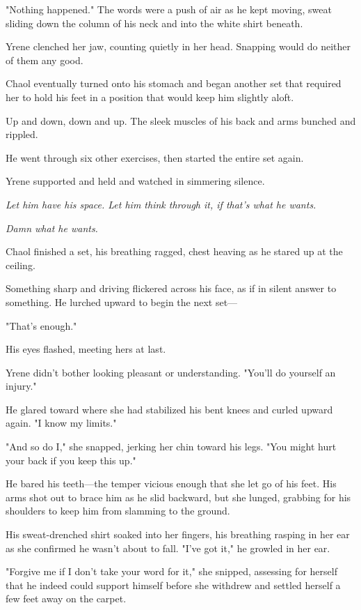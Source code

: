 "Nothing happened."
The words were a push of air as he kept moving, sweat sliding down the column of his neck and into the white shirt beneath.

Yrene clenched her jaw, counting quietly in her head.
Snapping would do neither of them any good.

Chaol eventually turned onto his stomach and began another set that required her to hold his feet in a position that would keep him slightly aloft.

Up and down, down and up.
The sleek muscles of his back and arms bunched and rippled.

He went through six other exercises, then started the entire set again.

Yrene supported and held and watched in simmering silence.

\emph{Let him have his space.
Let him think through it, if that's what he wants.}

\emph{Damn what he wants.}

Chaol finished a set, his breathing ragged, chest heaving as he stared up at the ceiling.

Something sharp and driving flickered across his face, as if in silent answer to something.
He lurched upward to begin the next set---

"That's enough."

His eyes flashed, meeting hers at last.

Yrene didn't bother looking pleasant or understanding.
"You'll do yourself an injury."

He glared toward where she had stabilized his bent knees and curled upward again.
"I know my limits."

"And so do I," she snapped, jerking her chin toward his legs.
"You might hurt your back if you keep this up."

He bared his teeth---the temper vicious enough that she let go of his feet.
His arms shot out to brace him as he slid backward, but she lunged, grabbing for his shoulders to keep him from slamming to the ground.

His sweat-drenched shirt soaked into her fingers, his breathing rasping in her ear as she confirmed he wasn't about to fall.
"I've got it," he growled in her ear.

"Forgive me if I don't take your word for it," she snipped, assessing for herself that he indeed could support himself before she withdrew and settled herself a few feet away on the carpet.

